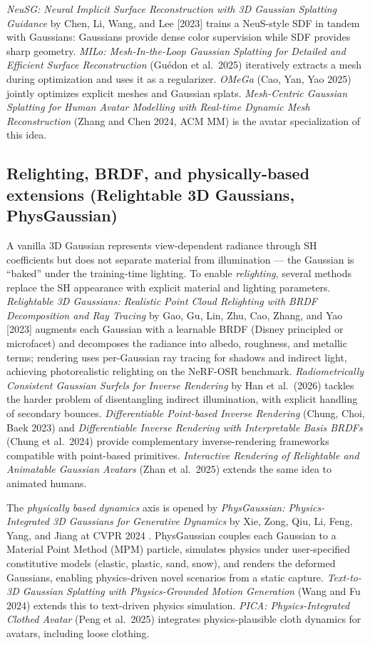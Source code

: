 \documentclass{article}
\begin{document}
\emph{NeuSG: Neural Implicit Surface Reconstruction with 3D Gaussian Splatting Guidance} by Chen, Li, Wang, and Lee {[}2023{]} trains a NeuS-style SDF in tandem with Gaussians: Gaussians provide dense color supervision while SDF provides sharp geometry. \emph{MILo: Mesh-In-the-Loop Gaussian Splatting for Detailed and Efficient Surface Reconstruction} (Guédon et al.~2025) iteratively extracts a mesh during optimization and uses it as a regularizer. \emph{OMeGa} (Cao, Yan, Yao 2025) jointly optimizes explicit meshes and Gaussian splats. \emph{Mesh-Centric Gaussian Splatting for Human Avatar Modelling with Real-time Dynamic Mesh Reconstruction} (Zhang and Chen 2024, ACM MM) is the avatar specialization of this idea.

\subsection{Relighting, BRDF, and physically-based extensions (Relightable 3D Gaussians, PhysGaussian)}\label{relighting-brdf-and-physically-based-extensions-relightable-3d-gaussians-physgaussian}

A vanilla 3D Gaussian represents view-dependent radiance through SH coefficients but does not separate material from illumination --- the Gaussian is ``baked'' under the training-time lighting. To enable \emph{relighting}, several methods replace the SH appearance with explicit material and lighting parameters. \emph{Relightable 3D Gaussians: Realistic Point Cloud Relighting with BRDF Decomposition and Ray Tracing} by Gao, Gu, Lin, Zhu, Cao, Zhang, and Yao {[}2023{]} augments each Gaussian with a learnable BRDF (Disney principled or microfacet) and decomposes the radiance into albedo, roughness, and metallic terms; rendering uses per-Gaussian ray tracing for shadows and indirect light, achieving photorealistic relighting on the NeRF-OSR benchmark. \emph{Radiometrically Consistent Gaussian Surfels for Inverse Rendering} by Han et al.~(2026) tackles the harder problem of disentangling indirect illumination, with explicit handling of secondary bounces. \emph{Differentiable Point-based Inverse Rendering} (Chung, Choi, Baek 2023) and \emph{Differentiable Inverse Rendering with Interpretable Basis BRDFs} (Chung et al.~2024) provide complementary inverse-rendering frameworks compatible with point-based primitives. \emph{Interactive Rendering of Relightable and Animatable Gaussian Avatars} (Zhan et al.~2025) extends the same idea to animated humans.

The \emph{physically based dynamics} axis is opened by \emph{PhysGaussian: Physics-Integrated 3D Gaussians for Generative Dynamics} by Xie, Zong, Qiu, Li, Feng, Yang, and Jiang at CVPR 2024 \cite{xie2024physgaussianphysic}. PhysGaussian couples each Gaussian to a Material Point Method (MPM) particle, simulates physics under user-specified constitutive models (elastic, plastic, sand, snow), and renders the deformed Gaussians, enabling physics-driven novel scenarios from a static capture. \emph{Text-to-3D Gaussian Splatting with Physics-Grounded Motion Generation} (Wang and Fu 2024) extends this to text-driven physics simulation. \emph{PICA: Physics-Integrated Clothed Avatar} (Peng et al.~2025) integrates physics-plausible cloth dynamics for avatars, including loose clothing.
\end{document}
